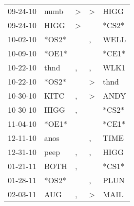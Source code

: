 \begin{supertabular}{p{0.07\textwidth}p{0.06\textwidth}p{0.02\textwidth}p{0.02\textwidth}p{0.06\textwidth}}
          09-24-10\textsuperscript{} &           numb\textsuperscript{} &     \textgreater &     \textgreater &           HIGG\textsuperscript{} \\
          09-24-10\textsuperscript{} &           HIGG\textsuperscript{} &     \textgreater &                  &                            *CS2* \\
          10-02-10\textsuperscript{} &                            *OS2* &                  &                , &           WELL\textsuperscript{} \\
          10-09-10\textsuperscript{} &                            *OE1* &                  &                  &                            *CE1* \\
          10-22-10\textsuperscript{} &           thnd\textsuperscript{} &                , &                , &           WLK1\textsuperscript{} \\
          10-22-10\textsuperscript{} &                            *OS2* &                  &     \textgreater &           thnd\textsuperscript{} \\
          10-30-10\textsuperscript{} &           KITC\textsuperscript{} &                , &     \textgreater &           ANDY\textsuperscript{} \\
          10-30-10\textsuperscript{} &           HIGG\textsuperscript{} &                , &                  &                            *CS2* \\
          11-04-10\textsuperscript{} &                            *OE1* &                  &                  &                            *CE1* \\
          12-11-10\textsuperscript{} &           anos\textsuperscript{} &                  &                , &           TIME\textsuperscript{} \\
          12-31-10\textsuperscript{} &           peep\textsuperscript{} &                , &                , &           HIGG\textsuperscript{} \\
          01-21-11\textsuperscript{} &           BOTH\textsuperscript{} &                , &                  &                            *CS1* \\
          01-28-11\textsuperscript{} &                            *OS2* &                  &                , &           PLUN\textsuperscript{} \\
          02-03-11\textsuperscript{} &            AUG\textsuperscript{} &                , &     \textgreater &           MAIL\textsuperscript{} \\

\end{supertabular}
